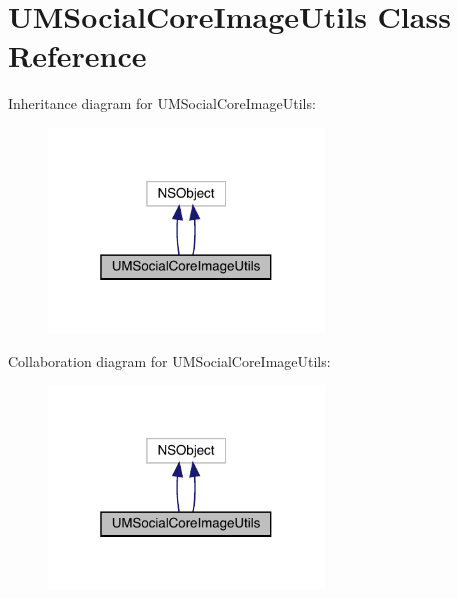 \hypertarget{interface_u_m_social_core_image_utils}{}\section{U\+M\+Social\+Core\+Image\+Utils Class Reference}
\label{interface_u_m_social_core_image_utils}


Inheritance diagram for U\+M\+Social\+Core\+Image\+Utils\+:\nopagebreak
\begin{figure}[H]
\begin{center}
\leavevmode
\includegraphics[width=208pt]{interface_u_m_social_core_image_utils__inherit__graph}
\end{center}
\end{figure}


Collaboration diagram for U\+M\+Social\+Core\+Image\+Utils\+:\nopagebreak
\begin{figure}[H]
\begin{center}
\leavevmode
\includegraphics[width=208pt]{interface_u_m_social_core_image_utils__coll__graph}
\end{center}
\end{figure}
